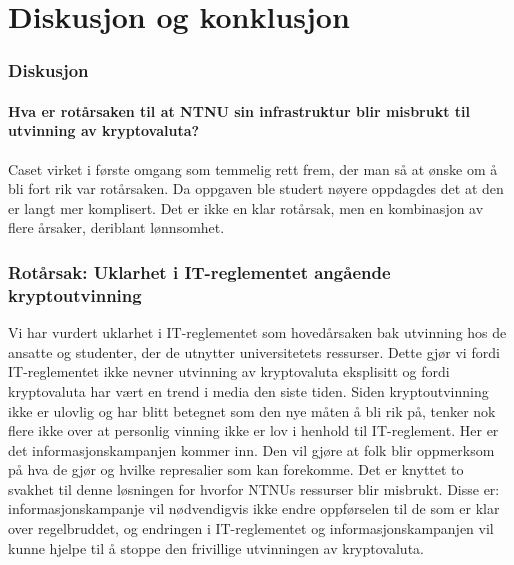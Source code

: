 \chapter{Diskusjon og konklusjon}
\subsection{Diskusjon}


\subsubsection{Hva er rotårsaken til at NTNU sin infrastruktur blir misbrukt til utvinning av kryptovaluta?}
Caset virket i første omgang som temmelig rett frem, der man så at ønske om å bli fort rik var rotårsaken. Da oppgaven ble studert nøyere oppdagdes det at den er langt mer komplisert. Det er ikke en klar rotårsak, men en kombinasjon av flere årsaker, deriblant lønnsomhet.

\subsection{Rotårsak: Uklarhet i IT-reglementet angående kryptoutvinning}
Vi har vurdert uklarhet i IT-reglementet som hovedårsaken bak utvinning hos de ansatte og studenter, der de utnytter universitetets ressurser. Dette gjør vi fordi IT-reglementet ikke nevner utvinning av kryptovaluta eksplisitt og fordi kryptovaluta har vært en trend i media den siste tiden. Siden kryptoutvinning ikke er ulovlig og har blitt betegnet som den nye måten å bli rik på, tenker nok flere ikke over at personlig vinning ikke er lov i henhold til IT-reglement. Her er det informasjonskampanjen kommer inn. Den vil gjøre at folk blir oppmerksom på hva de gjør og hvilke represalier som kan forekomme. Det er knyttet to svakhet til denne løsningen for hvorfor NTNUs ressurser blir misbrukt. Disse er: informasjonskampanje vil nødvendigvis ikke endre oppførselen til de som er klar over regelbruddet, og endringen i IT-reglementet og informasjonskampanjen vil kunne hjelpe til å stoppe den frivillige utvinningen av kryptovaluta.


